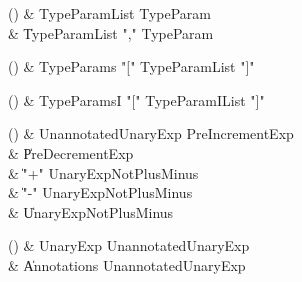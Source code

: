 \begin{bbgrammarappendix}{3.7in}

() & TypeParamList \label{prod:TypeParamList}  \: TypeParam  \\

 &    \| TypeParamList \xcd"," TypeParam \\

\end{bbgrammarappendix}

\begin{bbgrammarappendix}{4.0in}

() & TypeParams \label{prod:TypeParams}  \: \xcd"[" TypeParamList \xcd"]"  \\


\end{bbgrammarappendix}

\begin{bbgrammarappendix}{3.9in}

() & TypeParamsI \label{prod:TypeParamsI}  \: \xcd"[" TypeParamIList \xcd"]"  \\


\end{bbgrammarappendix}

\begin{bbgrammarappendix}{3.1in}

() & UnannotatedUnaryExp \label{prod:UnannotatedUnaryExp}  \: PreIncrementExp  \\

 &    \| PreDecrementExp \\
 &    \| \xcd"+" UnaryExpNotPlusMinus \\
 &    \| \xcd"-" UnaryExpNotPlusMinus \\
 &    \| UnaryExpNotPlusMinus \\

\end{bbgrammarappendix}

\begin{bbgrammarappendix}{4.2in}

() & UnaryExp \label{prod:UnaryExp}  \: UnannotatedUnaryExp  \\

 &    \| Annotations UnannotatedUnaryExp \\

\end{bbgrammarappendix}

